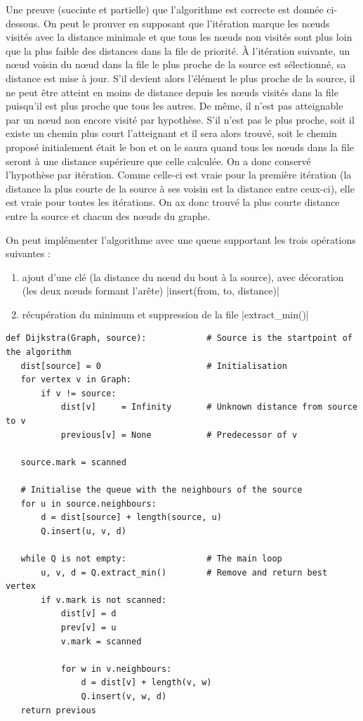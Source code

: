 \documentclass{article}
\begin{document}
Une preuve (succinte et partielle) que l'algorithme est correcte est
donnée ci-dessous. On peut le prouver en supposant que
l'itération marque les nœuds visités avec la distance minimale et que
tous les nœuds non visités sont plus loin que la plus faible des
distances dans la file de priorité. 
À l'itération suivante, un nœud voisin du nœud dans la file le plus
proche de la source est sélectionné, sa distance est mise à jour. S'il
devient alors l'élément le plus proche de la source, il ne peut être
atteint en moins de distance depuis les nœuds visités dans la file
puisqu'il est plus proche que tous les autres. De même, il n'est pas
atteignable par un nœud non encore visité par hypothèse. S'il n'est
pas le plus proche, soit il existe un chemin plus court l'atteignant
et il sera alors trouvé, soit le chemin proposé initialement était le
bon et on le saura quand tous les nœuds dans la file seront à une
distance supérieure que celle calculée. On a donc conservé l'hypothèse
par itération.
Comme celle-ci est vraie pour la première itération (la distance la
plus courte de la source à ses voisin est la distance entre ceux-ci),
elle est vraie pour toutes les itérations. On ax donc trouvé la plus
courte distance entre la source et chacun des nœuds du graphe.

On peut implémenter l'algorithme avec une queue supportant les trois
opérations suivantes :
\begin{enumerate}
  \item ajout d'une clé (la distance du nœud du bout à la source), avec
    décoration (les deux nœuds formant l'arête) 
    |insert(from, to, distance)|
  \item récupération du minimum et suppression de la file
    |extract_min()|
\end{enumerate}
\begin{verbatim}
def Dijkstra(Graph, source):            # Source is the startpoint of the algorithm
   dist[source] = 0                     # Initialisation
   for vertex v in Graph:           
       if v != source:
           dist[v]     = Infinity       # Unknown distance from source to v
           previous[v] = None           # Predecessor of v

   source.mark = scanned

   # Initialise the queue with the neighbours of the source
   for u in source.neighbours:
       d = dist[source] + length(source, u)
       Q.insert(u, v, d)

   while Q is not empty:                # The main loop
       u, v, d = Q.extract_min()        # Remove and return best vertex
       if v.mark is not scanned:
           dist[v] = d
           prev[v] = u
           v.mark = scanned

           for w in v.neighbours: 
               d = dist[v] + length(v, w) 
               Q.insert(v, w, d)
   return previous
\end{verbatim}
\end{document}
